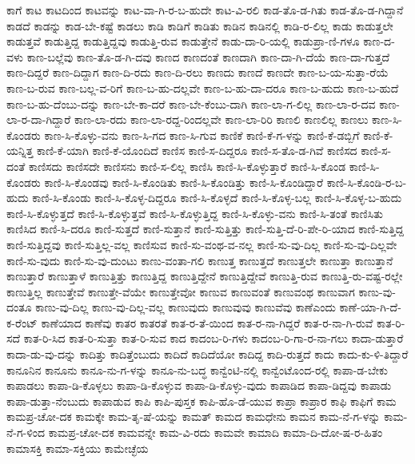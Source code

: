 {ಕಾಗೆ
ಕಾಟ
ಕಾಟದಿಂದ
ಕಾಟವನ್ನು
ಕಾಟ-ವಾ-ಗಿ-ರ-ಬ-ಹುದೇ
ಕಾಟ-ವಿ-ರಲಿ
ಕಾಡ-ತೊ-ಡ-ಗಿತು
ಕಾಡ-ತೊ-ಡ-ಗಿದ್ದಾನೆ
ಕಾಡದೆ
ಕಾಡನ್ನು
ಕಾಡ-ಬೇ-ಕಷ್ಟೆ
ಕಾಡಲು
ಕಾಡಿ
ಕಾಡಿಗೆ
ಕಾಡಿತು
ಕಾಡಿನ
ಕಾಡಿನಲ್ಲಿ
ಕಾಡಿ-ರ-ಲಿಲ್ಲ
ಕಾಡು
ಕಾಡುತ್ತಲೇ
ಕಾಡುತ್ತವೆ
ಕಾಡುತ್ತಿದ್ದ
ಕಾಡುತ್ತಿದ್ದವು
ಕಾಡುತ್ತಿ-ರುವ
ಕಾಡುತ್ತೇನೆ
ಕಾಡು-ದಾ-ರಿ-ಯಲ್ಲಿ
ಕಾಡುಪ್ರಾ-ಣಿ-ಗಳೂ
ಕಾಣ-ದ-ವಳು
ಕಾಣ-ಬಲ್ಲೆವು
ಕಾಣ-ತೊ-ಡ-ಗಿ-ದವು
ಕಾಣದ
ಕಾಣದಂತೆ
ಕಾಣದಾಗಿ
ಕಾಣ-ದಾ-ಗಿ-ದೆಯೆ
ಕಾಣ-ದಾ-ಗುತ್ತದೆ
ಕಾಣ-ದಿದ್ದರೆ
ಕಾಣ-ದಿದ್ದಾಗ
ಕಾಣ-ದಿ-ರದು
ಕಾಣ-ದಿ-ರಲು
ಕಾಣದು
ಕಾಣದೆ
ಕಾಣದೇ
ಕಾಣ-ಬ-ಯ-ಸುತ್ತಾ-ರೆಯೆ
ಕಾಣ-ಬ-ರುವ
ಕಾಣ-ಬಲ್ಲ-ವ-ರಿಗೆ
ಕಾಣ-ಬ-ಹು-ದಲ್ಲವೇ
ಕಾಣ-ಬ-ಹು-ದಾ-ದರೂ
ಕಾಣ-ಬ-ಹುದು
ಕಾಣ-ಬ-ಹುದೆ
ಕಾಣ-ಬ-ಹು-ದೆಂಬು-ದನ್ನು
ಕಾಣ-ಬೇ-ಕಾ-ದರೆ
ಕಾಣ-ಬೇ-ಕೆಂಬು-ದಾಗಿ
ಕಾಣ-ಲಾ-ಗ-ಲಿಲ್ಲ
ಕಾಣ-ಲಾ-ರ-ದವ
ಕಾಣ-ಲಾ-ರ-ದಾ-ಗಿದ್ದಾರೆ
ಕಾಣ-ಲಾ-ರದು
ಕಾಣ-ಲಾ-ರದ್ದ-ರಿಂದಲ್ಲವೇ
ಕಾಣ-ಲಾ-ರಿರಿ
ಕಾಣಲಿ
ಕಾಣಲಿಲ್ಲ
ಕಾಣಲು
ಕಾಣ-ಸಿ-ಕೊಂಡರು
ಕಾಣ-ಸಿ-ಕೊಳ್ಳು-ವನು
ಕಾಣ-ಸಿ-ಗದ
ಕಾಣ-ಸಿ-ಗುವ
ಕಾಣಿಕೆ
ಕಾಣಿ-ಕೆ-ಗ-ಳನ್ನು
ಕಾಣಿ-ಕೆ-ಡಬ್ಬಿಗೆ
ಕಾಣಿ-ಕೆ-ಯನ್ನಿತ್ತ
ಕಾಣಿ-ಕೆ-ಯಾಗಿ
ಕಾಣಿ-ಕೆ-ಯೊಂದಿದೆ
ಕಾಣಿಸ
ಕಾಣಿ-ಸ-ದಿದ್ದರೂ
ಕಾಣಿ-ಸ-ತೊ-ಡ-ಗಿವೆ
ಕಾಣಿಸದ
ಕಾಣಿ-ಸ-ದಂತೆ
ಕಾಣಿಸದು
ಕಾಣಿಸದೇ
ಕಾಣಿಸನು
ಕಾಣಿ-ಸ-ಲಿಲ್ಲ
ಕಾಣಿಸಿ
ಕಾಣಿ-ಸಿ-ಕೊಳ್ಳುತ್ತಾರೆ
ಕಾಣಿ-ಸಿ-ಕೊಂಡ
ಕಾಣಿ-ಸಿ-ಕೊಂಡರು
ಕಾಣಿ-ಸಿ-ಕೊಂಡವು
ಕಾಣಿ-ಸಿ-ಕೊಂಡಿತು
ಕಾಣಿ-ಸಿ-ಕೊಂಡಿತ್ತು
ಕಾಣಿ-ಸಿ-ಕೊಂಡಿದ್ದಾರೆ
ಕಾಣಿ-ಸಿ-ಕೊಂಡಿ-ರ-ಬ-ಹುದು
ಕಾಣಿ-ಸಿ-ಕೊಂಡು
ಕಾಣಿ-ಸಿ-ಕೊಳ್ಳ-ದಿದ್ದರೂ
ಕಾಣಿ-ಸಿ-ಕೊಳ್ಳದೆ
ಕಾಣಿ-ಸಿ-ಕೊಳ್ಳ-ಬಲ್ಲ
ಕಾಣಿ-ಸಿ-ಕೊಳ್ಳ-ಬ-ಹುದು
ಕಾಣಿ-ಸಿ-ಕೊಳ್ಳುತ್ತದೆ
ಕಾಣಿ-ಸಿ-ಕೊಳ್ಳುತ್ತವೆ
ಕಾಣಿ-ಸಿ-ಕೊಳ್ಳುತ್ತಿದ್ದ
ಕಾಣಿ-ಸಿ-ಕೊಳ್ಳು-ವನು
ಕಾಣಿ-ಸಿ-ತಂತೆ
ಕಾಣಿಸಿತು
ಕಾಣಿಸಿದ
ಕಾಣಿ-ಸಿ-ದರೂ
ಕಾಣಿ-ಸುತ್ತದೆ
ಕಾಣಿ-ಸುತ್ತಾನೆ
ಕಾಣಿ-ಸುತ್ತಿತ್ತು
ಕಾಣಿ-ಸುತ್ತಿ-ದೆ-ರಿ-ಪೇ-ರಿ-ಯಾದ
ಕಾಣಿ-ಸುತ್ತಿದ್ದ
ಕಾಣಿ-ಸುತ್ತಿದ್ದವು
ಕಾಣಿ-ಸುತ್ತಿಲ್ಲ-ವಲ್ಲ
ಕಾಣಿಸುವ
ಕಾಣಿ-ಸು-ವಂಥ-ವ-ನಲ್ಲ
ಕಾಣಿ-ಸು-ವು-ದಿಲ್ಲ
ಕಾಣಿ-ಸು-ವು-ದಿಲ್ಲವೇ
ಕಾಣಿ-ಸು-ವುದು
ಕಾಣಿ-ಸು-ವು-ದುಂಟು
ಕಾಣು-ವಂತಾ-ಗಲಿ
ಕಾಣುತ್ತ
ಕಾಣುತ್ತದೆ
ಕಾಣುತ್ತಲೇ
ಕಾಣುತ್ತಾ
ಕಾಣುತ್ತಾನೆ
ಕಾಣುತ್ತಾರೆ
ಕಾಣುತ್ತಾಳೆ
ಕಾಣುತ್ತಿತ್ತು
ಕಾಣುತ್ತಿದ್ದ
ಕಾಣುತ್ತಿದ್ದೇನೆ
ಕಾಣುತ್ತಿದ್ದೇವೆ
ಕಾಣುತ್ತಿ-ರುವ
ಕಾಣುತ್ತಿ-ರು-ವಷ್ಟ-ರಲ್ಲೇ
ಕಾಣುತ್ತಿಲ್ಲ
ಕಾಣುತ್ತೇವೆ
ಕಾಣುತ್ತೇ-ವೆಯೇ
ಕಾಣುತ್ತೇವೋ
ಕಾಣುವ
ಕಾಣುವಂತೆ
ಕಾಣುವಂಥ
ಕಾಣುವಾಗ
ಕಾಣು-ವು-ದಂತೂ
ಕಾಣು-ವು-ದಿಲ್ಲ
ಕಾಣು-ವು-ದಿಲ್ಲ-ವಲ್ಲ
ಕಾಣುವುದು
ಕಾಣುವುವು
ಕಾಣುವೆವು
ಕಾಣೆಎಂದು
ಕಾಣೆ-ಯಾ-ಗಿ-ದೆ-ಕ-ರೆಂಟ್
ಕಾಣೆಯಾದ
ಕಾಣೆವು
ಕಾತರ
ಕಾತರತೆ
ಕಾತ-ರ-ತೆ-ಯಿಂದ
ಕಾತ-ರ-ನಾ-ಗಿದ್ದರೆ
ಕಾತ-ರ-ನಾ-ಗಿ-ರುವೆ
ಕಾತ-ರಿ-ಸದೆ
ಕಾತ-ರಿ-ಸಿದ
ಕಾತ-ರಿ-ಸುತ್ತಾ
ಕಾತ-ರಿ-ಸುವ
ಕಾದ
ಕಾದಂಬ-ರಿ-ಗಳು
ಕಾದಂಬ-ರಿ-ಗಾ-ರ-ನಾ-ಗಲು
ಕಾದಾ-ಡುತ್ತಾರೆ
ಕಾದಾ-ಡು-ವು-ದನ್ನು
ಕಾದಿತ್ತು
ಕಾದಿತ್ತೆಂಬುದು
ಕಾದಿದೆ
ಕಾದಿದೆಯೋ
ಕಾದಿದ್ದ
ಕಾದಿ-ರುತ್ತದೆ
ಕಾದು
ಕಾದು-ಕು-ಳಿ-ತಿದ್ದಾರೆ
ಕಾನೂನಿನ
ಕಾನೂನು
ಕಾನೂ-ನು-ಗ-ಳನ್ನು
ಕಾನೂ-ನು-ಬದ್ಧ
ಕಾನ್ವೆಂಟಿ-ನಲ್ಲಿ
ಕಾನ್ವೆಂಟೊಂದ-ರಲ್ಲಿ
ಕಾಪಾ-ಡ-ಬೇಕು
ಕಾಪಾಡಲು
ಕಾಪಾ-ಡಿ-ಕೊಳ್ಳಲು
ಕಾಪಾ-ಡಿ-ಕೊಳ್ಳುವ
ಕಾಪಾ-ಡಿ-ಕೊಳ್ಳು-ವುದು
ಕಾಪಾಡಿದ
ಕಾಪಾ-ಡಿದ್ದವು
ಕಾಪಾಡು
ಕಾಪಾ-ಡುತ್ತಾ-ನೆಂಬುದು
ಕಾಪಾಡುವ
ಕಾಪಿ
ಕಾಪಿ-ಪುಸ್ತಕ
ಕಾಪಿ-ಹೊ-ಡೆ-ಯುವ
ಕಾಪ್ರಾ
ಕಾಪ್ರಾರ
ಕಾಫಿ
ಕಾಫಿಗೆ
ಕಾಮ
ಕಾಮಪ್ರ-ಚೋ-ದಕ
ಕಾಮಕ್ಕೇ
ಕಾಮ-ತೃ-ಷೆ-ಯನ್ನು
ಕಾಮತ್
ಕಾಮದ
ಕಾಮಧೇನು
ಕಾಮನ
ಕಾಮ-ನೆ-ಗ-ಳನ್ನು
ಕಾಮ-ನೆ-ಗ-ಳಿಂದ
ಕಾಮಪ್ರ-ಚೋ-ದಕ
ಕಾಮವನ್ನೇ
ಕಾಮ-ವಿ-ರದು
ಕಾಮವೇ
ಕಾಮಾದಿ
ಕಾಮಾ-ದಿ-ದೋ-ಷ-ರ-ಹಿತಂ
ಕಾಮಾಸಕ್ತಿ
ಕಾಮಾ-ಸಕ್ತಿಯು
ಕಾಮೇಚ್ಛೆಯ
}

